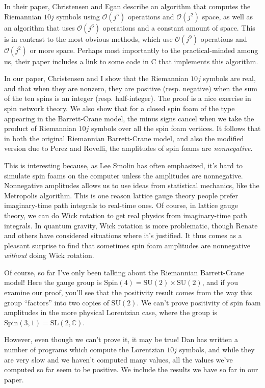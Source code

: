 \documentclass{article}
\begin{document}
In their paper, Christensen and Egan describe an algorithm that computes
the Riemannian \(10j\) symbols using \(\mathcal{O}(j^5)\) operations and
\(\mathcal{O}(j^2)\) space, as well as an algorithm that uses
\(\mathcal{O}(j^6)\) operations and a constant amount of space. This is
in contrast to the most obvious methods, which use \(\mathcal{O}(j^9)\)
operations and \(\mathcal{O}(j^2)\) or more space. Perhaps most
importantly to the practical-minded among us, their paper includes a
link to some code in C that implements this algorithm.

In our paper, Christensen and I show that the Riemannian \(10j\) symbols
are real, and that when they are nonzero, they are positive (resp.
negative) when the sum of the ten spins is an integer (resp.
half-integer). The proof is a nice exercise in spin network theory. We
also show that for a closed spin foam of the type appearing in the
Barrett-Crane model, the minus signs cancel when we take the product of
Riemannian \(10j\) symbols over all the spin foam vertices. It follows
that in both the original Riemannian Barrett-Crane model, and also the
modified version due to Perez and Rovelli, the amplitudes of spin foams
are \emph{nonnegative}.

This is interesting because, as Lee Smolin has often emphasized, it's
hard to simulate spin foams on the computer unless the amplitudes are
nonnegative. Nonnegative amplitudes allows us to use ideas from
statistical mechanics, like the Metropolis algorithm. This is one reason
lattice gauge theory people prefer imaginary-time path integrals to
real-time ones. Of course, in lattice gauge theory, we can do Wick
rotation to get real physics from imaginary-time path integrals. In
quantum gravity, Wick rotation is more problematic, though Renate and
others have considered situations where it's justified. It thus comes as
a pleasant surprise to find that sometimes spin foam amplitudes are
nonnegative \emph{without} doing Wick rotation.

Of course, so far I've only been talking about the Riemannian
Barrett-Crane model! Here the gauge group is
\(\mathrm{Spin}(4) = \mathrm{SU}(2) \times \mathrm{SU}(2)\), and if you
examine our proof, you'll see that the positivity result comes from the
way this group ``factors'' into two copies of \(\mathrm{SU}(2)\). We
can't prove positivity of spin foam amplitudes in the more physical
Lorentzian case, where the group is
\(\mathrm{Spin}(3,1) = \mathrm{SL}(2,\mathbb{C})\).

However, even though we can't prove it, it may be true! Dan has written
a number of programs which compute the Lorentzian \(10j\) symbols, and
while they are very slow and we haven't computed many values, all the
values we've computed so far seem to be positive. We include the results
we have so far in our paper.
\end{document}
